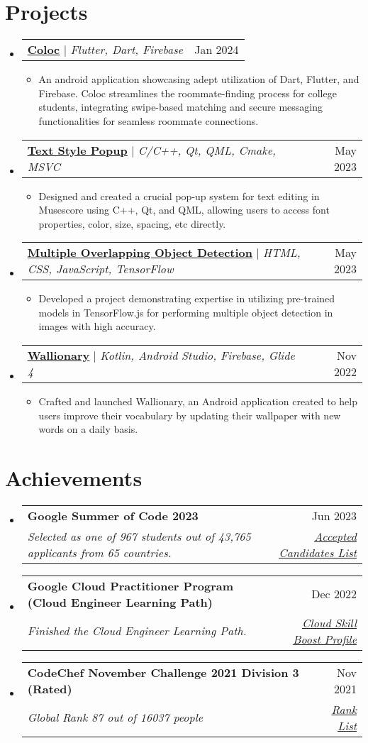 \documentclass[letterpaper,11pt]{article}
\makeatletter
\newcommand{\resumeItem}[1]{
  \item\small{
    {#1 \vspace{-2pt}}
  }
}
\newcommand{\resumeSubheading}[4]{
  \vspace{-2pt}\item
    \begin{tabular*}{0.97\textwidth}[t]{l@{\extracolsep{\fill}}r}
      \textbf{#1} & #2 \\
      \textit{\small#3} & \textit{\small #4} \\
    \end{tabular*}\vspace{-7pt}
}
\newcommand{\resumeProjectHeading}[2]{
    \item
    \begin{tabular*}{0.97\textwidth}{l@{\extracolsep{\fill}}r}
      \small#1 & #2 \\
    \end{tabular*}\vspace{-7pt}
}
\newcommand{\resumeSubHeadingListStart}{\begin{itemize}[leftmargin=0.15in, label={}]}
\newcommand{\resumeSubHeadingListEnd}{\end{itemize}}
\newcommand{\resumeItemListStart}{\begin{itemize}}
\newcommand{\resumeItemListEnd}{\end{itemize}\vspace{-5pt}}
\makeatother
\begin{document}
\section{Projects}
    \resumeSubHeadingListStart
        \resumeProjectHeading
          {\textbf{\href{https://github.com/octopols/coloc_mobile}{\underline{Coloc}}} $|$ \emph{Flutter, Dart, Firebase}}{Jan 2024}
          \resumeItemListStart
            \resumeItem{An android application showcasing adept utilization of Dart, Flutter, and Firebase. Coloc streamlines the roommate-finding process for college students, integrating swipe-based matching and secure messaging functionalities for seamless roommate connections.}
          \resumeItemListEnd
        \resumeProjectHeading
          {\textbf{\href{https://github.com/musescore/MuseScore/pull/18436}{\underline{Text Style Popup}}} $|$ \emph{C/C++, Qt, QML, Cmake, MSVC}}{May 2023}
          \resumeItemListStart
            \resumeItem{Designed and created a crucial pop-up system for text editing in Musescore using C++, Qt, and QML, allowing
            users to access font properties, color, size, spacing, etc directly.}
          \resumeItemListEnd
      \resumeProjectHeading
          {\textbf{\href{https://github.com/octopols/Multiple-Overlapping-Object-Detection}{\underline{Multiple Overlapping Object Detection}}} $|$ \emph{HTML, CSS, JavaScript, TensorFlow}}{May 2023}
          \resumeItemListStart
            \resumeItem{Developed a project demonstrating expertise in utilizing pre-trained models in TensorFlow.js for performing multiple object detection in images with high accuracy.}
          \resumeItemListEnd
      \resumeProjectHeading
          {\textbf{\href{https://github.com/octopols/wallionary}{\underline{Wallionary}}} $|$ \emph{Kotlin, Android Studio, Firebase, Glide 4}}{Nov 2022}
          \resumeItemListStart
            \resumeItem{Crafted and launched Wallionary, an Android application created to help users improve their vocabulary by updating their wallpaper with new words on a daily basis.}
          \resumeItemListEnd
    \resumeSubHeadingListEnd


\section{Achievements}
    \resumeSubHeadingListStart
      \resumeSubheading{Google Summer of Code 2023}{Jun 2023}{Selected as one of 967 students out of 43,765 applicants from 65 countries.}{\href{https://summerofcode.withgoogle.com/programs/2023/projects}{\underline{Accepted Candidates List}}}
      \resumeSubheading{Google Cloud Practitioner Program (Cloud Engineer Learning Path)}{Dec 2022}{Finished the Cloud Engineer Learning Path.}{\href{https://www.cloudskillsboost.google/public_profiles/19b211dc-6aa0-4b6f-a1bb-58c00b38c43e}{\underline{Cloud Skill Boost Profile}}}
      \resumeSubheading{CodeChef November Challenge 2021 Division 3 (Rated)}{Nov 2021}{Global Rank 87 out of 16037 people}{\href{https://www.codechef.com/rankings/NOV21C}{\underline{Rank List}}}
    \resumeSubHeadingListEnd
\end{document}
